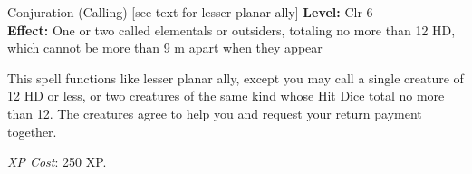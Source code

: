 {Conjuration (Calling) [see text for lesser planar ally]}
{
	\textbf{Level:}
	Clr 6\\
	\textbf{Effect:}
	One or two called elementals or outsiders, totaling no more than 12 HD, which cannot be more than 9 m apart when they appear\\
}
{
	This spell functions like lesser planar ally, except you may call a single creature of 12 HD or less, or two creatures of the same kind whose Hit Dice total no more than 12. The creatures agree to help you and request your return payment together.

	\textit{XP Cost}:
	250 XP.

}
